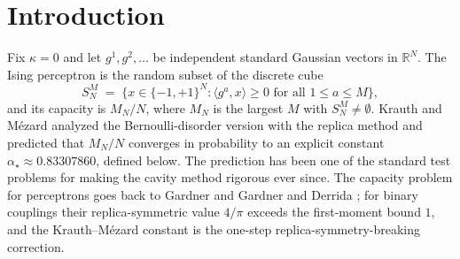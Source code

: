 \documentclass[11pt]{article}
\newcommand{\R}{\mathbb{R}}
\begin{document}
\section{Introduction}

Fix $\kappa = 0$ and let $g^1, g^2, \ldots$ be independent standard Gaussian
vectors in $\R^N$. The Ising perceptron is the random subset of the discrete
cube
\[
  S_N^M \;=\; \bigl\{ x \in \{-1,+1\}^N : \langle g^a, x\rangle \ge 0
  \text{ for all } 1 \le a \le M \bigr\},
\]
and its capacity is $M_N/N$, where $M_N$ is the largest $M$ with
$S_N^M \neq \emptyset$. Krauth and M\'ezard \cite{krauth1989storage} analyzed
the Bernoulli-disorder version with the replica method and predicted that $M_N/N$ converges in
probability to an explicit constant $\alpha_\star \approx 0.83307860$,
defined below. The prediction has been one of the standard test problems for
making the cavity method rigorous ever since. The capacity problem for
perceptrons goes back to Gardner \cite{gardner1988space} and Gardner and
Derrida \cite{gardner1988optimal}; for binary couplings their
replica-symmetric value $4/\pi$ exceeds the first-moment bound $1$, and the
Krauth--M\'ezard constant is the one-step replica-symmetry-breaking
correction.
\end{document}
